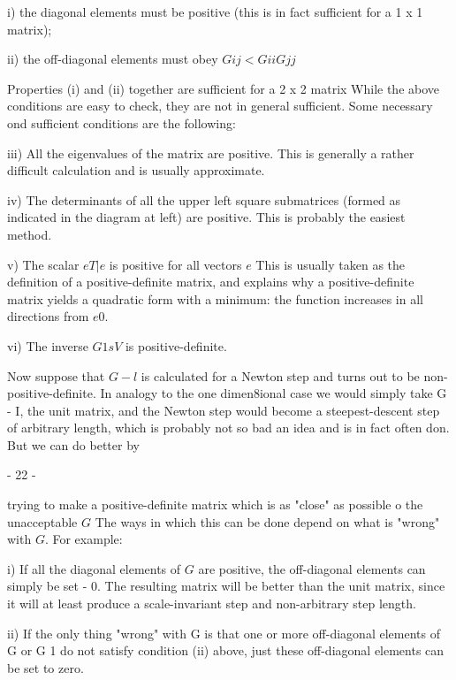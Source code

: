   i) the diagonal elements must be positive (this is in fact sufficient
     for a 1 x 1 matrix);
 
 ii) the off-diagonal elements must obey $Gij < GiiGjj$
 
Properties (i) and (ii) together are sufficient for a 2 x 2 matrix
While the above conditions are easy to check, they are not in general
sufficient.  Some necessary ond sufficient conditions are the following:
 
 iii) All the eigenvalues of the matrix are positive. This is generally
      a rather difficult calculation and is usually approximate.
 
 iv) The determinants of all the upper left square submatrices (formed
                                     as indicated in the diagram at left) are
                                      positive.  This is probably the easiest method.
 
  v) The scalar $eT|e$ is positive for all vectors $e$  This is usually
     taken as the definition of a positive-definite matrix, and explains
     why a positive-definite matrix yields a quadratic form with a
     minimum:  the function increases in all directions from $e  0$.
 
 vi) The inverse $G 1 s V$ is positive-definite.
 
     Now suppose that $G-l$ is calculated for a Newton  step and turns out
to be non-positive-definite.  In analogy to the one dimen8ional case we
would simply take G - I, the unit matrix, and the Newton step would
become a steepest-descent step of arbitrary length, which is probably
not so bad an idea and is in fact often don.  But we can do better by
 
                                - 22 -
 
 
trying to make a positive-definite matrix which is as "close" as possible
o the unacceptable $G$  The ways in which this can be done depend on
what is "wrong" with $G$.  For example:
 
  i) If all the diagonal elements of $G$ are positive, the off-diagonal
     elements can simply be set - 0.  The resulting matrix will be better
     than the unit matrix, since it will at least produce a
     scale-invariant step and non-arbitrary step length.
 
 ii) If the only thing "wrong" with G is that one or more off-diagonal
     elements of G or G 1 do not satisfy condition (ii) above, just these
     off-diagonal elements can be set to zero.
 
